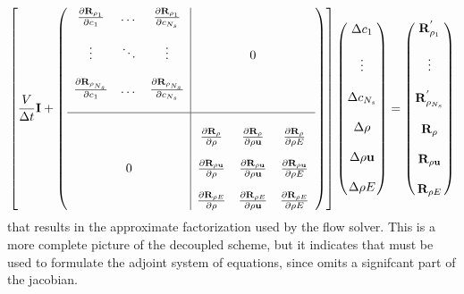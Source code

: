 \begin{equation}
  \left[ 
    \frac{V}{\Delta t} \mathbf I + 
    \left(
    \begin{array}{c c c | c c c }
      \frac{\partial \mathbf R_{\rho_1}}{\partial c_1}      & \dots  & \frac{\partial \mathbf R_{\rho_1}}{\partial c_{N_s}} & & & \\[12pt]
      \vdots                    & \ddots & \vdots                       & & 0 & \\[12pt]
      \frac{\partial \mathbf R_{\rho_{N_s}}}{\partial c_1}  & \dots  & \frac{\partial \mathbf R_{\rho_{N_s}}}{\partial c_{N_s}} & & & \\[12pt]
      \hline
      & & & & & \\
      & & & \frac{\partial \mathbf R_{\rho}}{\partial \rho}        & \frac{\partial \mathbf R_{\rho}}{\partial \rho \mathbf u}        &  \frac{\partial \mathbf R_{\rho}}{\partial \rho E}     \\[12pt]
      & 0 & & \frac{\partial \mathbf R_{\rho \mathbf u}}{\partial \rho}    & \frac{\partial \mathbf R_{\rho \mathbf u}}{\partial \rho \mathbf u}    &  \frac{\partial \mathbf R_{\rho \mathbf u}}{\partial \rho E} \\[12pt]
      & & & \frac{\partial \mathbf R_{\rho E}}{\partial \rho}      & \frac{\partial \mathbf R_{\rho E}}{\partial \rho \mathbf u}      &  \frac{\partial \mathbf R_{\rho E}}{\partial \rho E}
    \end{array}
    \right)
  \right]
  \begin{pmatrix}
    \Delta c_1      \\ \\
    \vdots     \\ \\
    \Delta c_{N_s}  \\ \\
    \Delta \rho     \\ \\
    \Delta \rho \mathbf u \\ \\
    \Delta \rho E
  \end{pmatrix}
  =
  \begin{pmatrix}
    \mathbf R_{\rho_1}^{'}     \\ \\
    \vdots               \\ \\
    \mathbf R_{\rho_{N_s}}^{'} \\ \\
    \mathbf R_{\rho}           \\ \\
    \mathbf R_{\rho \mathbf u}       \\ \\
    \mathbf R_{\rho E}
  \end{pmatrix}
  \label{dc-sparse-system}
\end{equation}
that results in the approximate factorization used by the flow solver.  This is
a more complete picture of the decoupled scheme, but it indicates that
 must be used to formulate the adjoint system of equations,
since  omits a signifcant part of the jacobian.

